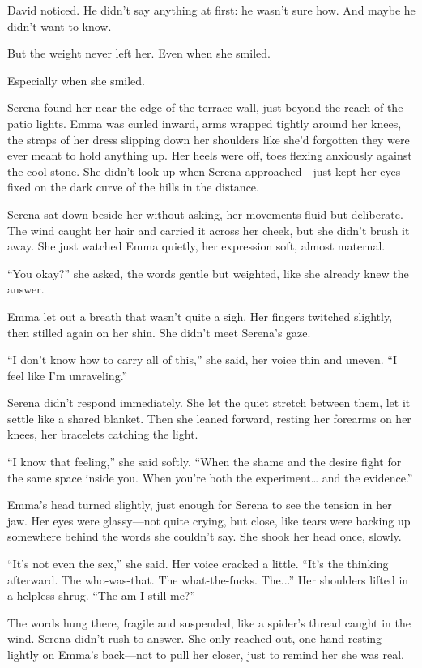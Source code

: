 David noticed. He didn’t say anything at first: he wasn’t sure how. And maybe he didn’t want to know. 

But the weight never left her. Even when she smiled.

Especially when she smiled.

Serena found her near the edge of the terrace wall, just beyond the reach of the patio lights. Emma was 
curled inward, arms wrapped tightly around her knees, the straps of her dress slipping down her shoulders 
like she’d forgotten they were ever meant to hold anything up. Her heels were off, toes flexing anxiously 
against the cool stone. She didn’t look up when Serena approached—just kept her eyes fixed on the dark 
curve of the hills in the distance.

Serena sat down beside her without asking, her movements fluid but deliberate. The wind caught her hair 
and carried it across her cheek, but she didn’t brush it away. She just watched Emma quietly, her expression 
soft, almost maternal.

“You okay?” she asked, the words gentle but weighted, like she already knew the answer.

Emma let out a breath that wasn’t quite a sigh. Her fingers twitched slightly, then stilled again on her 
shin. She didn’t meet Serena’s gaze.

“I don’t know how to carry all of this,” she said, her voice thin and uneven. “I feel like I’m unraveling.”

Serena didn’t respond immediately. She let the quiet stretch between them, let it settle like a shared 
blanket. Then she leaned forward, resting her forearms on her knees, her bracelets catching the light.

“I know that feeling,” she said softly. “When the shame and the desire fight for the same space inside 
you. When you’re both the experiment… and the evidence.”

Emma’s head turned slightly, just enough for Serena to see the tension in her jaw. Her eyes were 
glassy—not quite crying, but close, like tears were backing up somewhere behind the words she couldn’t 
say. She shook her head once, slowly.

“It’s not even the sex,” she said. Her voice cracked a little. “It’s the thinking afterward. The 
who-was-that. The what-the-fucks. The...” Her shoulders lifted in a helpless shrug. “The am-I-still-me?”

The words hung there, fragile and suspended, like a spider’s thread caught in the wind. Serena didn’t 
rush to answer. She only reached out, one hand resting lightly on Emma’s back—not to pull her closer, 
just to remind her she was real.

